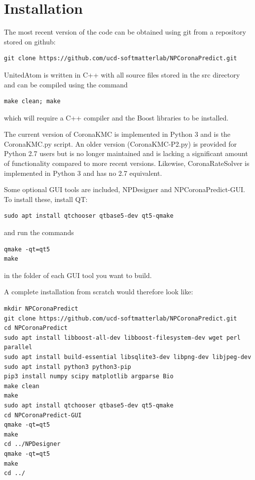 \documentclass[10pt,a4paper,onecolumn]{report}
\begin{document}
\section{Installation} \label{section:installation}
The most recent version of the code can be obtained using git from a repository stored on github:
\begin{lstlisting}
git clone https://github.com/ucd-softmatterlab/NPCoronaPredict.git
\end{lstlisting}

UnitedAtom is written in C++ with all source files stored in the src directory and can be compiled using the command
\begin{lstlisting}
make clean; make
\end{lstlisting}
which will require a C++ compiler and the Boost libraries to be installed.

The current version of CoronaKMC is implemented in Python 3 and is the CoronaKMC.py script. An older version (CoronaKMC-P2.py) is provided for Python 2.7 users but is no longer maintained and is lacking a significant amount of functionality compared to more recent versions.  Likewise, CoronaRateSolver is implemented in Python 3 and has no 2.7 equivalent.
 
Some optional GUI tools are included, NPDesigner and NPCoronaPredict-GUI. To install these, install QT:
\begin{lstlisting}
sudo apt install qtchooser qtbase5-dev qt5-qmake 
\end{lstlisting} 

and run the commands

\begin{lstlisting}
qmake -qt=qt5
make
\end{lstlisting} 
in the folder of each GUI tool you want to build. 

A complete installation from scratch would therefore look like:

\begin{lstlisting}
mkdir NPCoronaPredict
git clone https://github.com/ucd-softmatterlab/NPCoronaPredict.git
cd NPCoronaPredict
sudo apt install libboost-all-dev libboost-filesystem-dev wget perl parallel  
sudo apt install build-essential libsqlite3-dev libpng-dev libjpeg-dev
sudo apt install python3 python3-pip
pip3 install numpy scipy matplotlib argparse Bio
make clean
make
sudo apt install qtchooser qtbase5-dev qt5-qmake 
cd NPCoronaPredict-GUI
qmake -qt=qt5
make
cd ../NPDesigner
qmake -qt=qt5
make
cd ../
\end{lstlisting}
\end{document}
